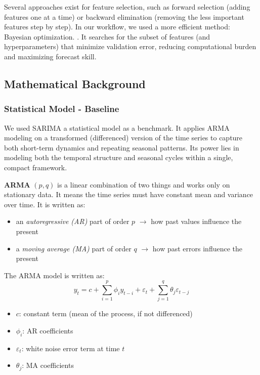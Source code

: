 Several approaches exist for feature selection, such as forward selection (adding 
features one at a time) or backward elimination (removing the less important features step
by step). In our workflow, we used a more efficient method: Bayesian optimization.
\cite{sklearn_feature_selection}. It searches for the subset of features (and 
hyperparameters) that minimize validation error, reducing computational burden and 
maximizing forecast skill.


\subsection{Mathematical Background}
\label{subsec:math}

\subsubsection*{Statistical Model - Baseline}

We used SARIMA a statistical model as a benchmark. It applies ARMA modeling on a 
transformed (differenced) version of the time series to capture both short-term 
dynamics and repeating seasonal patterns. Its power lies in modeling both the temporal 
structure and seasonal cycles within a single, compact framework.

\textbf{ARMA} $(p, q)$ is a linear combination of two things and works only on 
stationary data. It means the time series must have constant mean and variance over 
time. It is written as:
\begin{itemize}
    \item an \emph{autoregressive (AR)} part of order $p$ $\rightarrow$ how past values influence the present
    \item a \emph{moving average (MA)} part of order $q$ $\rightarrow$ how past errors influence the present
\end{itemize}
The ARMA model is written as:
$$
y_t = c + \sum_{i=1}^{p} \phi_i y_{t-i} + \varepsilon_t + \sum_{j=1}^{q} \theta_j \varepsilon_{t-j}
$$
\begin{itemize}
    \item $c$: constant term (mean of the process, if not differenced)
    \item $\phi_i$: AR coefficients
    \item $\varepsilon_t$: white noise error term at time $t$
    \item $\theta_j$: MA coefficients
\end{itemize}

